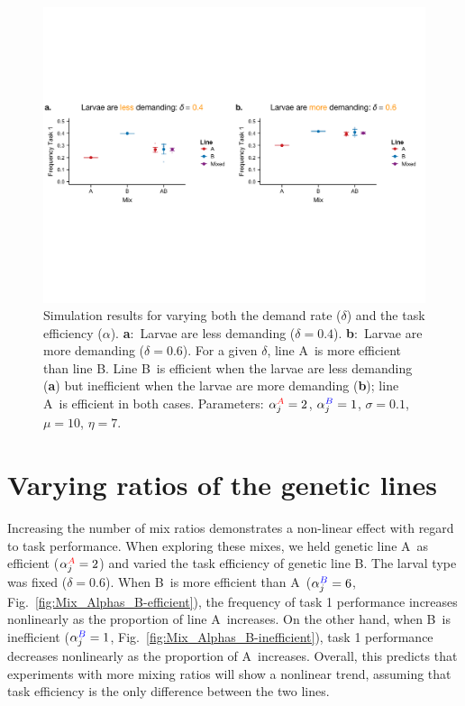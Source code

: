 \documentclass[11pt]{article}
\newcommand{\A}{{\color{red}A}}
\newcommand{\B}{{\color{blue}B}}
\begin{document}
\begin{figure}[H]
    \centering
    \includegraphics[trim={0 2.75in 0 2.6in}, clip, width=\linewidth]{doc/deltas_gen1gen2.pdf}
    \caption{Simulation results for varying both the demand rate ($\delta$) and the task efficiency ($\alpha$). 
    \textbf{a}:~Larvae are less demanding ($\delta = 0.4$). \textbf{b}:~Larvae are more demanding ($\delta = 0.6$).
    For a given $\delta$, line \A\ is more efficient than line \B. Line \B\ is efficient when the larvae are less demanding (\textbf{a}) but inefficient when the larvae are more demanding (\textbf{b}); line \A\ is efficient in both cases.  Parameters: $\alpha_{j}^{\A}  = 2$, $\alpha_{j}^{\B}  = 1$, $\sigma = 0.1$, $\mu = 10$, $\eta = 7$.}
    \label{fig:deltasupdown}
\end{figure}

\newpage
\section{Varying ratios of the genetic lines} \label{sec:varyratios}
Increasing the number of mix ratios demonstrates a non-linear effect with regard to task performance. When exploring these mixes, we held genetic line \A\ as efficient ($\alpha_j^{\A} = 2$) and varied the task efficiency of genetic line \B. The larval type was fixed ($\delta = 0.6$).
When \B\ is more efficient than \A\ ($\alpha_j^{\B} = 6$, Fig.~\ref{fig:Mix_Alphas_B-efficient}), the frequency of task 1 performance increases nonlinearly as the proportion of line \A\ increases. On the other hand, when \B\ is inefficient ($\alpha_j^{\B} = 1$, Fig.~\ref{fig:Mix_Alphas_B-inefficient}), task 1 performance decreases nonlinearly as the proportion of \A\ increases. Overall, this predicts that experiments with more mixing ratios will show a nonlinear trend, assuming that task efficiency is the only difference between the two lines. 
\end{document}
